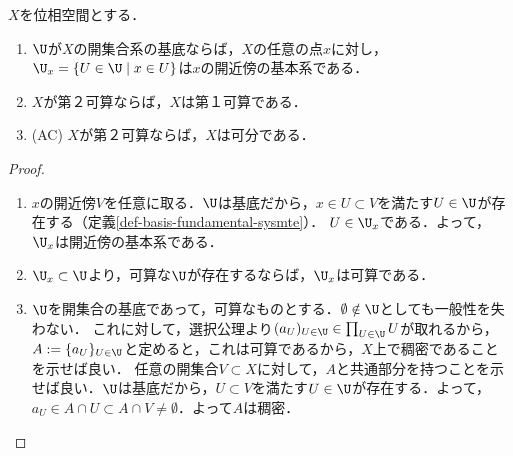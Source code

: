 \documentclass[uplatex,dvipdfmx]{jsreport}
\begin{document}
\begin{proposition}\label{prop-sep-general-space}
    $X$を位相空間とする．
    \begin{enumerate}
        \item $\U$が$X$の開集合系の基底ならば，$X$の任意の点$x$に対し，$\U_x=\{U\in\U\mid x\in U\}$は$x$の開近傍の基本系である．
        \item $X$が第２可算ならば，$X$は第１可算である．
        \item (AC) $X$が第２可算ならば，$X$は可分である．
    \end{enumerate}
\end{proposition}
\begin{proof}\mbox{}
    \begin{enumerate}
        \item $x$の開近傍$V$を任意に取る．$\U$は基底だから，$x\in U\subset V$を満たす$U\in\U$が存在する（定義\ref{def-basis-fundamental-sysmte}）．
        $U\in\U_x$である．よって，$\U_x$は開近傍の基本系である．
        \item $\U_x\subset\U$より，可算な$\U$が存在するならば，$\U_x$は可算である．
        \item $\U$を開集合の基底であって，可算なものとする．$\emptyset\notin\U$としても一般性を失わない．
        これに対して，選択公理より$(a_U)_{U\in\U}\in\prod_{U\in\U}U$が取れるから，$A:=\{a_U\}_{U\in\U}$と定めると，これは可算であるから，$X$上で稠密であることを示せば良い．
        任意の開集合$V\subset X$に対して，$A$と共通部分を持つことを示せば良い．$\U$は基底だから，$U\subset V$を満たす$U\in\U$が存在する．よって，$a_U\in A\cap U\subset A\cap V\ne\emptyset$．よって$A$は稠密．
    \end{enumerate}
\end{proof}
\end{document}
